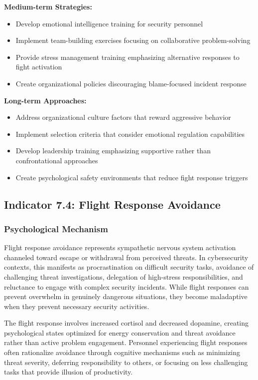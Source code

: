 \documentclass[11pt,a4paper]{article}
\begin{document}
\textbf{Medium-term Strategies:}
\begin{itemize}
\item Develop emotional intelligence training for security personnel
\item Implement team-building exercises focusing on collaborative problem-solving
\item Provide stress management training emphasizing alternative responses to fight activation
\item Create organizational policies discouraging blame-focused incident response
\end{itemize}

\textbf{Long-term Approaches:}
\begin{itemize}
\item Address organizational culture factors that reward aggressive behavior
\item Implement selection criteria that consider emotional regulation capabilities
\item Develop leadership training emphasizing supportive rather than confrontational approaches
\item Create psychological safety environments that reduce fight response triggers
\end{itemize}

\subsection{Indicator 7.4: Flight Response Avoidance}

\subsubsection{Psychological Mechanism}

Flight response avoidance represents sympathetic nervous system activation channeled toward escape or withdrawal from perceived threats\cite{gray1988}. In cybersecurity contexts, this manifests as procrastination on difficult security tasks, avoidance of challenging threat investigations, delegation of high-stress responsibilities, and reluctance to engage with complex security incidents. While flight responses can prevent overwhelm in genuinely dangerous situations, they become maladaptive when they prevent necessary security activities\cite{barlow2002}.

The flight response involves increased cortisol and decreased dopamine, creating psychological states optimized for energy conservation and threat avoidance rather than active problem engagement\cite{sapolsky2004}. Personnel experiencing flight responses often rationalize avoidance through cognitive mechanisms such as minimizing threat severity, deferring responsibility to others, or focusing on less challenging tasks that provide illusion of productivity\cite{avoidance2021}.
\end{document}
